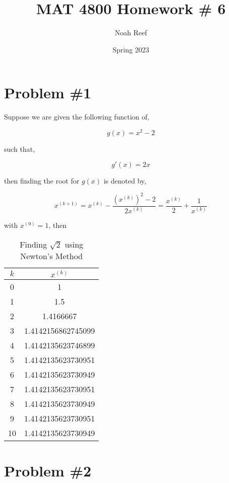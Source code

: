 \documentclass{article}
\title{MAT 4800 Homework \# 6 }
\author{Noah Reef }
\date{Spring 2023}
\begin{document}
\maketitle

\section*{Problem \#1}
Suppose we are given the following function of,

\begin{equation*}
    g(x) = x^2-2
\end{equation*}

such that,

\begin{equation*}
    g'(x) = 2x
\end{equation*}

then finding the root for $g(x)$ is denoted by,

\begin{equation*}
    x^{(k+1)} = x^{(k)} - \frac{(x^{(k)})^2 - 2}{2x^{(k)}} = \frac{x^{(k)}}{2} + \frac{1}{x^{(k)}}
\end{equation*}

with $x^{(0)} = 1$, then

\begin{table}[H]
    \centering
    \begin{tabular}{c|c}
        $k$ &  $x^{(k)}$ \\
        \hline{} 0 &  1\\
        1 & 1.5\\
        2 & 1.4166667\\
        3 & 1.4142156862745099\\
        4 & 1.4142135623746899 \\
        5 & 1.4142135623730951\\
        6 & 1.4142135623730949\\
        7 & 1.4142135623730951\\
        8 & 1.4142135623730949\\
        9 & 1.4142135623730951\\
        10 &1.4142135623730949 
        
    \end{tabular}
    \caption{Finding $\sqrt{2}$ using Newton's Method}
    \label{tab:my_label}
\end{table}

\section*{Problem \#2}
\end{document}
